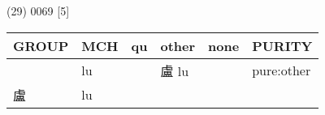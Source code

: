 \documentclass[14pt,a4paper]{scrartcl}
\begin{document}
(29) 0069 {[}5{]}

\begin{longtable}[c]{@{}llllll@{}}
\toprule
\begin{minipage}[b]{0.14\columnwidth}\raggedright\strut
GROUP
\strut\end{minipage} &
\begin{minipage}[b]{0.14\columnwidth}\raggedright\strut
MCH
\strut\end{minipage} &
\begin{minipage}[b]{0.14\columnwidth}\raggedright\strut
qu
\strut\end{minipage} &
\begin{minipage}[b]{0.14\columnwidth}\raggedright\strut
other
\strut\end{minipage} &
\begin{minipage}[b]{0.14\columnwidth}\raggedright\strut
none
\strut\end{minipage} &
\begin{minipage}[b]{0.14\columnwidth}\raggedright\strut
PURITY
\strut\end{minipage}\tabularnewline
\midrule
\endhead
\begin{minipage}[t]{0.14\columnwidth}\raggedright\strut
𧆣
\strut\end{minipage} &
\begin{minipage}[t]{0.14\columnwidth}\raggedright\strut
lu
\strut\end{minipage} &
\begin{minipage}[t]{0.14\columnwidth}\raggedright\strut
\strut\end{minipage} &
\begin{minipage}[t]{0.14\columnwidth}\raggedright\strut
盧 lu
\strut\end{minipage} &
\begin{minipage}[t]{0.14\columnwidth}\raggedright\strut
\strut\end{minipage} &
\begin{minipage}[t]{0.14\columnwidth}\raggedright\strut
pure:other
\strut\end{minipage}\tabularnewline
\begin{minipage}[t]{0.14\columnwidth}\raggedright\strut
盧
\strut\end{minipage} &
\begin{minipage}[t]{0.14\columnwidth}\raggedright\strut
lu
\strut\end{minipage} &
\begin{minipage}[t]{0.14\columnwidth}\raggedright\strut
\strut\end{minipage} &

\end{longtable}
\end{document}
